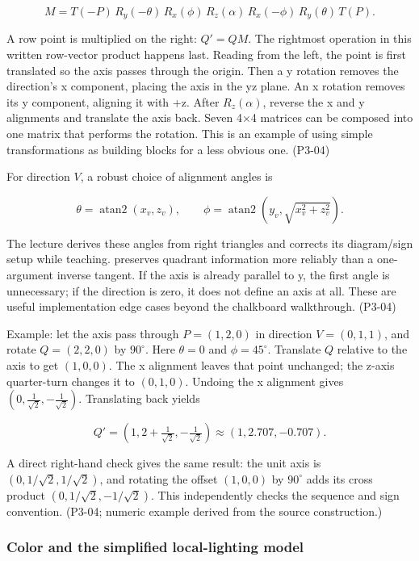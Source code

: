 \[
M=T(-P)\,R_y(-\theta)\,R_x(\phi)\,R_z(\alpha)\,R_x(-\phi)\,R_y(\theta)\,T(P).
\]

A row point is multiplied on the right: \(Q'=QM\). The rightmost operation in this written row-vector product happens last. Reading from the left, the point is first translated so the axis passes through the origin. Then a y rotation removes the direction's x component, placing the axis in the yz plane. An x rotation removes its y component, aligning it with +z. After \(R_z(\alpha)\), reverse the x and y alignments and translate the axis back. Seven 4×4 matrices can be composed into one matrix that performs the rotation. This is an example of using simple transformations as building blocks for a less obvious one. (P3-04)

For direction \(V\), a robust choice of alignment angles is

\[
\theta=\operatorname{atan2}(x_v,z_v),\qquad
\phi=\operatorname{atan2}\left(y_v,\sqrt{x_v^2+z_v^2}\right).
\]

The lecture derives these angles from right triangles and corrects its diagram/sign setup while teaching.  preserves quadrant information more reliably than a one-argument inverse tangent. If the axis is already parallel to y, the first angle is unnecessary; if the direction is zero, it does not define an axis at all. These are useful implementation edge cases beyond the chalkboard walkthrough. (P3-04)

Example: let the axis pass through \(P=(1,2,0)\) in direction \(V=(0,1,1)\), and rotate \(Q=(2,2,0)\) by \(90^\circ\). Here \(\theta=0\) and \(\phi=45^\circ\). Translate \(Q\) relative to the axis to get \((1,0,0)\). The x alignment leaves that point unchanged; the z-axis quarter-turn changes it to \((0,1,0)\). Undoing the x alignment gives \((0,\frac{1}{\sqrt2},-\frac{1}{\sqrt2})\). Translating back yields

\[
Q'=(1,2+\tfrac{1}{\sqrt2},-\tfrac{1}{\sqrt2})\approx(1,2.707,-0.707).
\]

A direct right-hand check gives the same result: the unit axis is \((0,1/\sqrt2,1/\sqrt2)\), and rotating the offset \((1,0,0)\) by \(90^\circ\) adds its cross product \((0,1/\sqrt2,-1/\sqrt2)\). This independently checks the sequence and sign convention. (P3-04; numeric example derived from the source construction.)

\subsubsection{Color and the simplified local-lighting model}\label{03-visual-computing-i-ch011-color-and-the-simplified-local-lighting-model}

